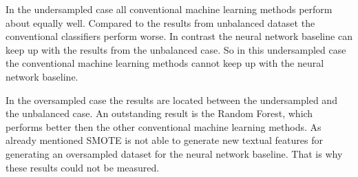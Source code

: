 In the undersampled case all conventional machine learning methods perform about equally well. Compared to the results from unbalanced dataset the conventional classifiers perform worse. In contrast the neural network baseline can keep up with the results from the unbalanced case. So in this undersampled case the conventional machine learning methods cannot keep up with the neural network baseline.

In the oversampled case the results are located between the undersampled and the unbalanced case. An outstanding result is the Random Forest, which performs better then the other conventional machine learning methods. As already mentioned SMOTE is not able to generate new textual features for generating an oversampled dataset for the neural network baseline. That is why these results could not be measured.
